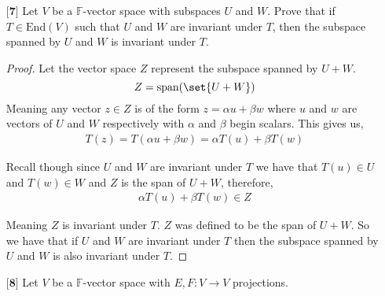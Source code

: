 \documentclass[12pt]{article}
\DeclarePairedDelimiter\set\{\}
\begin{document}
\begin{itemize}
\begin{proof}
        therefore we have as desired that $\left(I + \frac{D}{1!} + \frac{D^2}{2!} + \dots + \frac{D^{n-1}}{(n - 1)!}\right)p(x) = L$
        \end{proof}
    
    \vspace{.5cm}
    \item[$\textbf{[7]}$]
    Let $V$ be a $\mathbb{F}$-vector space with subspaces $U$ and $W$. Prove that if $T \in \text{End}(V)$ such that $U$ and $W$ are invariant under $T$, then the subspace spanned by $U$ and $W$ is invariant under $T$. 

    \begin{proof}
        Let the vector space $Z$ represent the subspace spanned by $U+W$.
        \[Z = \text{span}(\set{U+W})\]
        Meaning any vector $z\in Z$ is of the form $z = \alpha u + \beta w$ where $u$ and $w$ are vectors of $U$ and $W$ respectively with $\alpha$ and $\beta$ begin scalars. This gives us,
        \begin{align*}
            T(z) = T(\alpha u + \beta w) = \alpha T( u) + \beta T( w) 
        \end{align*}

        Recall though since $U$ and $W$ are invariant under $T$ we have that $T(u)\in U$ and $T(w) \in W$ and $Z$ is the span of $U+W$, therefore,
        \begin{align*}
            \alpha T( u) + \beta T( w)  \in Z
        \end{align*}

        Meaning $Z$ is invariant under $T$. $Z$ was defined to be the span of $U+W$. So we have that if $U$ and $W$ are invariant under $T$ then the subspace spanned by $U$ and $W$ is also invariant under $T$.
    \end{proof}
    
    \item[$\textbf{[8]}$]
    Let $V$ be a $\mathbb{F}$-vector space with $E,F: V \rightarrow V$ projections. 
    \begin{itemize}


\end{itemize}
\end{itemize}
\end{document}
